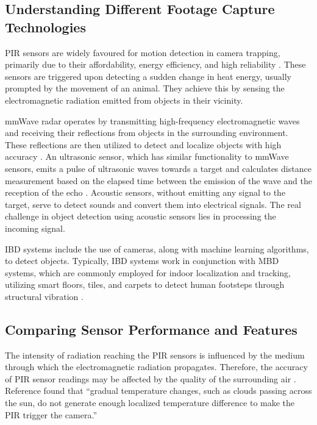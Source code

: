 \documentclass[class=report,11pt,crop=false]{standalone}
\begin{document}
\subsection{Understanding Different Footage Capture Technologies}
\acrfull{PIR} sensors are widely favoured for motion detection in camera trapping, primarily due to their affordability, energy efficiency, and high reliability \cite{CommonMisconceptions}.  These sensors are triggered upon detecting a sudden change in heat energy, usually prompted by the movement of an animal. They achieve this by sensing the electromagnetic radiation emitted from objects in their vicinity. 

\acrfull{mmWave} radar operates by transmitting high-frequency electromagnetic waves and receiving their reflections from objects in the surrounding environment. These reflections are then utilized to detect and localize objects with high accuracy \cite{mmWave1}. An ultrasonic sensor, which has similar functionality to \acrshort{mmWave} sensors, emits a pulse of ultrasonic waves towards a target and calculates distance measurement based on the elapsed time between the emission of the wave and the reception of the echo \cite{UltrasonicAgri} \cite{UltrasonicObjectDetect}. Acoustic sensors, without emitting any signal to the target, serve to detect sounds and convert them into electrical signals. The real challenge in object detection using acoustic sensors lies in processing the incoming signal.

\acrfull{IBD} systems include the use of cameras, along with machine learning algorithms, to detect objects. Typically, \acrshort{IBD} systems work in conjunction with \acrfull{MBD} systems, which are commonly employed for indoor localization and tracking, utilizing smart floors, tiles, and carpets to detect human footsteps through structural vibration \cite{ShutteredPIR}.



\subsection{Comparing Sensor Performance and Features}

The intensity of radiation reaching the \acrshort{PIR} sensors is influenced by the medium through which the electromagnetic radiation propagates. Therefore, the accuracy of \acrshort{PIR} sensor readings may be affected by the quality of the surrounding air \cite{CommonMisconceptions}. Reference \cite{HowCamersTrapsWork} found that “gradual temperature changes, such as clouds passing across the sun, do not generate enough localized temperature difference to make the \acrshort{PIR} trigger the camera.” 
\end{document}
